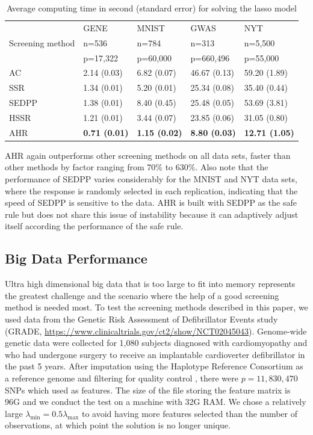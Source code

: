 \documentclass[]{interact}
\theoremstyle{plain}%
\theoremstyle{definition}
\theoremstyle{remark}
\begin{document}
\begin{table}[H]
\centering
\begin{tabular}{lllll}
\toprule
 & GENE & MNIST & GWAS & NYT \\
Screening method & n=536 & n=784 & n=313 & n=5,500 \\
       & p=17,322 & p=60,000 & p=660,496 & p=55,000 \\
\midrule
AC & 2.14 (0.03) & 6.82 (0.07) & 46.67 (0.13) & 59.20 (1.89) \\
SSR & 1.34 (0.01) & 5.20 (0.01) & 25.34 (0.08) & 35.40 (0.44) \\
SEDPP & 1.38 (0.01) & 8.40 (0.45) & 25.48 (0.05) & 53.69 (3.81) \\
HSSR & 1.21 (0.01) & 3.44 (0.07) & 23.85 (0.06) & 31.05 (0.80) \\
AHR & \textbf{0.71 (0.01)} & \textbf{1.15 (0.02)} & \textbf{8.80 (0.03)} & \textbf{12.71 (1.05)} \\
\bottomrule
\end{tabular}
\caption{Average computing time in second (standard error) for solving the lasso model}
\label{Tab:real}
\end{table}

AHR again outperforms other screening methods on all data sets, faster than other methods by factor ranging from 70\% to 630\%. Also note that the performance of SEDPP varies considerably for the MNIST and NYT data sets, where the response is randomly selected in each replication, indicating that the speed of SEDPP is sensitive to the data. AHR is built with SEDPP as the safe rule but does not share this issue of instability because it can adaptively adjust itself according the performance of the safe rule.

\subsection{Big Data Performance}

Ultra high dimensional big data that is too large to fit into memory represents the greatest challenge and the scenario where the help of a good screening method is needed most. To test the screening methods described in this paper, we used data from the Genetic Risk Assessment of Defibrillator Events study (GRADE, \url{https://www.clinicaltrials.gov/ct2/show/NCT02045043}). Genome-wide genetic data were collected for 1,080 subjects diagnosed with cardiomyopathy and who had undergone surgery to receive an implantable cardioverter defibrillator in the past 5 years. After imputation using the Haplotype Reference Consortium as a reference genome and filtering for quality control \citep{Das2016}, there were $p=11,830,470$ SNPs which used as features. The size of the file storing the feature matrix is 96G and we conduct the test on a machine with 32G RAM. We chose a relatively large $\lambda_{\min} =0.5\lambda_{\max}$ to avoid having more features selected than the number of observations, at which point the solution is no longer unique.
\end{document}
